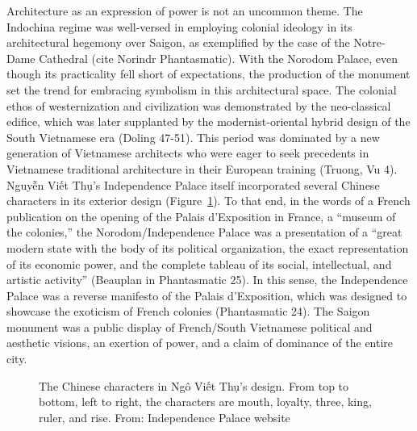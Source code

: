 Architecture as an expression of power is not an uncommon theme. The Indochina regime was well-versed in employing colonial ideology in its architectural hegemony over Saigon, as exemplified by the case of the Notre-Dame Cathedral (cite Norindr Phantasmatic). With the Norodom Palace, even though its practicality fell short of expectations, the production of the monument set the trend for embracing symbolism in this architectural space. The colonial ethos of westernization and civilization was demonstrated by the neo-classical edifice, which was later supplanted by the modernist-oriental hybrid design of the South Vietnamese era (Doling 47-51). This period was dominated by a new generation of Vietnamese architects who were eager to seek precedents in Vietnamese traditional architecture in their European training (Truong, Vu 4).  Nguyễn Viết Thụ’s Independence Palace itself incorporated several Chinese characters in its exterior design (Figure~\ref{palace_chinese}). To that end, in the words of a French publication on the opening of the Palais d’Exposition in France, a “museum of the colonies,” the Norodom/Independence Palace was a presentation of a “great modern state with the body of its political organization, the exact representation of its economic power, and the complete tableau of its social, intellectual, and artistic activity” (Beauplan in Phantasmatic 25). In this sense, the Independence Palace was a reverse manifesto of the Palais d’Exposition, which was designed to showcase the exoticism of French colonies (Phantasmatic 24). The Saigon monument was a public display of French/South Vietnamese political and aesthetic visions, an exertion of power, and a claim of dominance of the entire city. \en

\begin{figure}[!ht]
\begin{center}
\vspace{-.2 in}
\caption{\vi The Chinese characters in Ngô Viết Thụ's design. From top to bottom, left to right, the characters are mouth, loyalty, three, king, ruler, and rise. From: Independence Palace website \en}\label{palace_chinese}
\end{center}
\vspace{-.2 in}
\end{figure}


